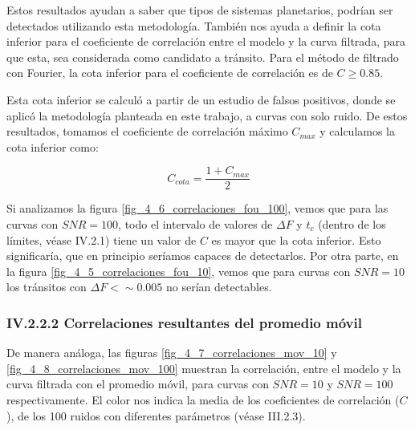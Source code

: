 Estos resultados ayudan a saber que tipos de sistemas planetarios, podrían ser detectados utilizando esta metodología. También nos ayuda a definir la cota inferior para el coeficiente de correlación entre el modelo y la curva filtrada, para que esta, sea considerada como candidato a tránsito. Para el método de filtrado con Fourier, la cota inferior para el coeficiente de correlación es de $C \geq 0.85 $. 

Esta cota inferior se calculó a partir de un estudio de falsos positivos, donde se aplicó la metodología planteada en este trabajo, a curvas con solo ruido. De estos resultados, tomamos el coeficiente de correlación máximo $C_{max}$ y calculamos la cota inferior como: 

\begin{equation}
	C_{cota}= \dfrac{1+C_{max}}{2}
\end{equation}


Si analizamos la figura \ref{fig_4_6_correlaciones_fou_100}, vemos que para las curvas con $SNR=100$, todo el intervalo de valores de $\Delta F$ y $t_{c}$ (dentro de los límites, véase IV.2.1) tiene un valor de $C$ es mayor que la cota inferior. Esto significaría, que en principio seríamos capaces de detectarlos. Por otra parte, en la figura \ref{fig_4_5_correlaciones_fou_10}, vemos que para curvas con $SNR=10$ los tránsitos con $\Delta F < \sim 0.005$ no serían detectables.

\subsubsection*{IV.2.2.2 Correlaciones resultantes del promedio móvil}

De manera análoga, las figuras \ref{fig_4_7_correlaciones_mov_10} y \ref{fig_4_8_correlaciones_mov_100} muestran la correlación, entre el modelo y la curva filtrada con el promedio móvil, para curvas con $SNR=10$ y $SNR=100$ respectivamente. El color nos indica la media de los coeficientes de correlación ($C$), de los 100 ruidos con diferentes parámetros (véase III.2.3).

